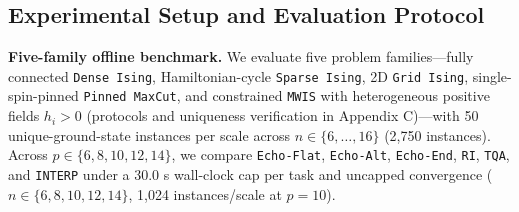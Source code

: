 \documentclass{article}
\theoremstyle{plain}
\theoremstyle{definition}
\begin{document}
\begin{table}[t]
\vskip 0.02in
\caption{End-to-end optimization ground-state probabilities (\%) on the MWIS test set ($n=10, p=10$, 1,024 instances) under projective shot noise ($40$ evaluations/step; \texttt{Echo-Prior} denotes \texttt{Echo-Prior-Flat} using $0+640$, $0+1280$, and $0+2560$ evaluations at $16, 32, 64$ steps vs. $32+2560$ for \texttt{TQA}; last column reports 64-step paired gain with 95\% CI).}
\label{tab:5}
\vskip 0.01in
\centering
\footnotesize
\renewcommand{\arraystretch}{0.96}
\setlength{\tabcolsep}{5.5pt}
\vskip -0.10in
\end{table}

\subsection{Experimental Setup and Evaluation Protocol}\label{subsec:5_1}

\textbf{Five-family offline benchmark.} We evaluate five problem families---fully connected \texttt{Dense Ising}, Hamiltonian-cycle \texttt{Sparse Ising}, 2D \texttt{Grid Ising}, single-spin-pinned \texttt{Pinned MaxCut}, and constrained \texttt{MWIS} with heterogeneous positive fields $h_i>0$ (protocols and uniqueness verification in Appendix C)---with 50 unique-ground-state instances per scale across $n\in\{6,\ldots,16\}$ (2,750 instances). Across $p\in\{6,8,10,12,14\}$, we compare \texttt{Echo-Flat}, \texttt{Echo-Alt}, \texttt{Echo-End}, \texttt{RI}, \texttt{TQA}, and \texttt{INTERP} under a 30.0 s wall-clock cap per task and uncapped convergence ($n\in\{6,8,10,12,14\}$, 1,024 instances/scale at $p=10$).
\end{document}
